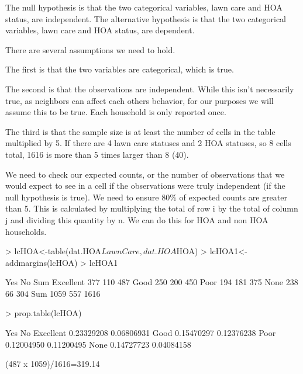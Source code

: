 \documentclass{article}
\begin{document}
The null hypothesis is that the two categorical variables, lawn care and HOA status, are independent.
The alternative hypothesis is that the two categorical variables, lawn care and HOA status, are dependent. 

There are several assumptions we need to hold. 

The first is that the two variables are categorical, which is true.

The second is that the observations are independent. While this isn't necessarily true, as neighbors can affect each others behavior, for our purposes we will assume this to be true. Each household is only reported once. 

The third is that the sample size is at least the number of cells in the table multiplied by 5. If there are 4 lawn care statuses and 2 HOA statuses, so 8 cells total, 1616 is more than 5 times larger than 8 (40). 

We need to check our expected counts, or the number of observations that we would expect to see in a cell if the observations were truly independent (if the null hypothesis is true). We need to ensure 80\% of expected counts are greater than 5. This is calculated by multiplying the total of row i by the total of column j and dividing this quantity by n. We can do this for HOA and non HOA households. 

\begin{Schunk}
\begin{Sinput}
> lcHOA<-table(dat.HOA$LawnCare,dat.HOA$HOA)
> lcHOA1<-addmargins(lcHOA)
> lcHOA1
\end{Sinput}
\begin{Soutput}
             Yes   No  Sum
  Excellent  377  110  487
  Good       250  200  450
  Poor       194  181  375
  None       238   66  304
  Sum       1059  557 1616
\end{Soutput}
\begin{Sinput}
> prop.table(lcHOA)
\end{Sinput}
\begin{Soutput}
                   Yes         No
  Excellent 0.23329208 0.06806931
  Good      0.15470297 0.12376238
  Poor      0.12004950 0.11200495
  None      0.14727723 0.04084158
\end{Soutput}
\end{Schunk}
(487 x 1059)/1616=319.14
\end{document}
